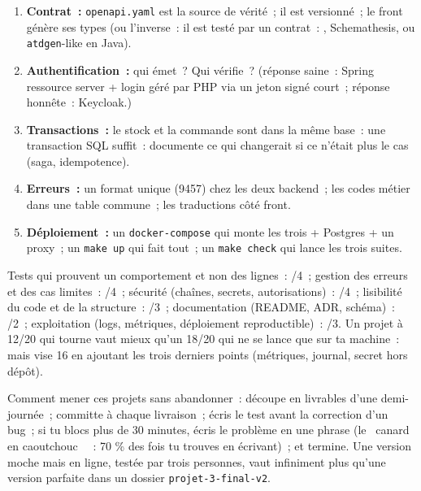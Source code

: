 \begin{enumerate}
  \item \textbf{Contrat~:} \verb|openapi.yaml| est la source de v\'erit\'e~; il est versionn\'e~; le front
        g\'en\`ere ses types (ou l'inverse~: il est test\'e par un contrat~: ,
        Schemathesis, ou \verb|atdgen|-like en Java).
  \item \textbf{Authentification~:} qui \'emet~? Qui v\'erifie~? (r\'eponse saine~: Spring ressource
        server + login g\'er\'e par PHP via un jeton sign\'e court~; r\'eponse honn\^ete~: Keycloak.)
  \item \textbf{Transactions~:} le stock et la commande sont dans la m\^eme base~: une transaction
        SQL suffit~: documente ce qui changerait si ce n'\'etait plus le cas (saga, idempotence).
  \item \textbf{Erreurs~:} un format unique (9457) chez les deux backend~; les codes m\'etier dans une
        table commune~; les traductions c\^ot\'e front.
  \item \textbf{D\'eploiement~:} un \verb|docker-compose| qui monte les trois + Postgres + un proxy~;
        un \verb|make up| qui fait tout~; un \verb|make check| qui lance les trois suites.
\end{enumerate}

Tests qui prouvent un comportement et non des lignes~: /4~; gestion des erreurs et des cas limites~:
/4~; s\'ecurit\'e (cha\^ines, secrets, autorisations)~: /4~; lisibilit\'e du code et de la structure~: /3~;
documentation (README, ADR, sch\'ema)~: /2~; exploitation (logs, m\'etriques, d\'eploiement reproductible)~: /3.
Un projet \`a 12/20 qui tourne vaut mieux qu'un 18/20 qui ne se lance que sur ta machine~: mais
vise 16 en ajoutant les trois derniers points (m\'etriques, journal, secret hors d\'ep\^ot).

\begin{note}
Comment mener ces projets sans abandonner~: d\'ecoupe en livrables d'une demi-journ\'ee~; committe \`a chaque
livraison~; \'ecris le test avant la correction d'un bug~; si tu blocs plus de
30 minutes, \'ecris le probl\`eme en une phrase (le \og ~canard en caoutchouc~ \fg{}~: 70 \% des fois tu
trouves en \'ecrivant)~; et termine. Une version moche mais en ligne, test\'ee par trois personnes,
vaut infiniment plus qu'une version parfaite dans un dossier \verb|projet-3-final-v2|.
\end{note}

